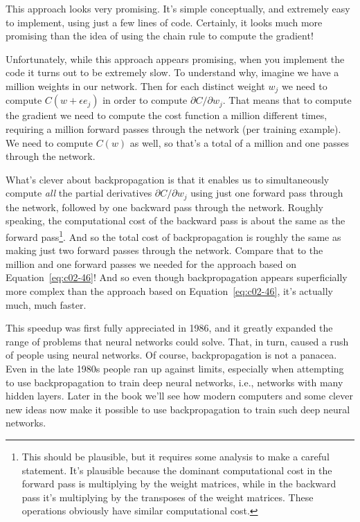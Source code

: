 This approach looks very promising. It's simple conceptually, and extremely easy to implement, using just a few lines of code. Certainly, it looks much more promising than the idea of using the chain rule to compute the gradient!

Unfortunately, while this approach appears promising, when you implement the code it turns out to be extremely slow. To understand why, imagine we have a million weights in our network. Then for each distinct weight $w_j$ we need to compute $C\left(w+\epsilon e_{j}\right)$ in order to compute $\partial C / \partial w_{j}$. That means that to compute the gradient we need to compute the cost function a million different times, requiring a million forward passes through the network (per training example). We need to compute $C(w)$ as well, so that's a total of a million and one passes through the network.

What's clever about backpropagation is that it enables us to simultaneously compute \textit{all} the partial derivatives $\partial C / \partial w_{j}$ using just one forward pass through the network, followed by one backward pass through the network. Roughly speaking, the computational cost of the backward pass is about the same as the forward pass\footnote{This should be plausible, but it requires some analysis to make a careful statement. It's plausible because the dominant computational cost in the forward pass is multiplying by the weight matrices, while in the backward pass it's multiplying by the transposes of the weight matrices. These operations obviously have similar computational cost.}. And so the total cost of backpropagation is roughly the same as making just two forward passes through the network. Compare that to the million and one forward passes we needed for the approach based on Equation~\ref{eq:c02-46}! And so even though backpropagation appears superficially more complex than the approach based on Equation~\ref{eq:c02-46}, it's actually much, much faster.

This speedup was first fully appreciated in 1986, and it greatly expanded the range of problems that neural networks could solve. That, in turn, caused a rush of people using neural networks. Of course, backpropagation is not a panacea. Even in the late 1980s people ran up against limits, especially when attempting to use backpropagation to train deep neural networks, i.e., networks with many hidden layers. Later in the book we'll see how modern computers and some clever new ideas now make it possible to use backpropagation to train such deep neural networks.

